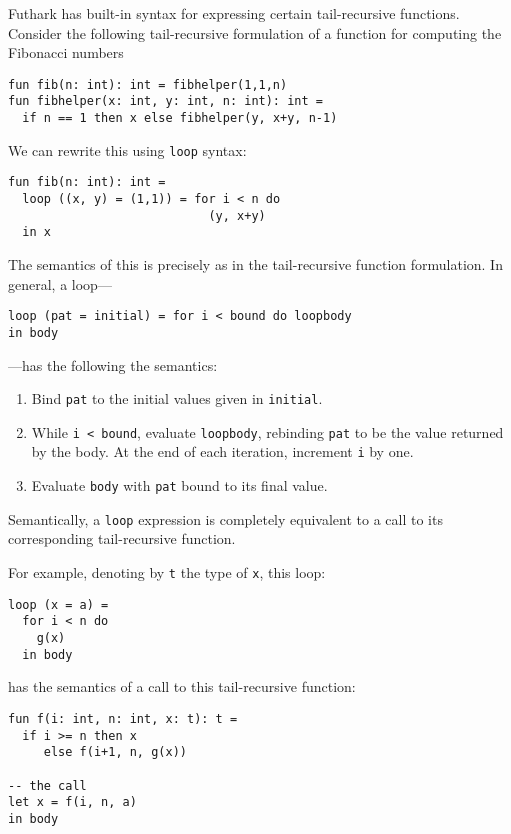 \documentclass[11pt]{book}
\begin{document}
Futhark has built-in syntax for expressing certain tail-recursive
functions.  Consider the following tail-recursive formulation of a
function for computing the Fibonacci numbers

\begin{lstlisting}
fun fib(n: int): int = fibhelper(1,1,n)
fun fibhelper(x: int, y: int, n: int): int =
  if n == 1 then x else fibhelper(y, x+y, n-1)
\end{lstlisting}

We can rewrite this using \texttt{loop} syntax:

\begin{lstlisting}
fun fib(n: int): int =
  loop ((x, y) = (1,1)) = for i < n do
                            (y, x+y)
  in x
\end{lstlisting}

The semantics of this is precisely as in the tail-recursive function
formulation.  In general, a loop---

\begin{lstlisting}
loop (pat = initial) = for i < bound do loopbody
in body
\end{lstlisting}

---has the following the semantics:

\begin{enumerate}
\item Bind \texttt{pat} to the initial values given in
  \texttt{initial}.
\item While \texttt{i < bound}, evaluate \texttt{loopbody}, rebinding
  \texttt{pat} to be the value returned by the body.  At the end of
  each iteration, increment \texttt{i} by one.
\item Evaluate \texttt{body} with \texttt{pat} bound to its final
  value.
\end{enumerate}

Semantically, a \texttt{loop} expression is completely equivalent to a
call to its corresponding tail-recursive function.

For example, denoting by \texttt{t} the type of \texttt{x}, this
loop:

\begin{lstlisting}
loop (x = a) =
  for i < n do
    g(x)
  in body
\end{lstlisting}

has the semantics of a call to this tail-recursive function:

\begin{lstlisting}
fun f(i: int, n: int, x: t): t =
  if i >= n then x
     else f(i+1, n, g(x))

-- the call
let x = f(i, n, a)
in body
\end{lstlisting}
\end{document}

